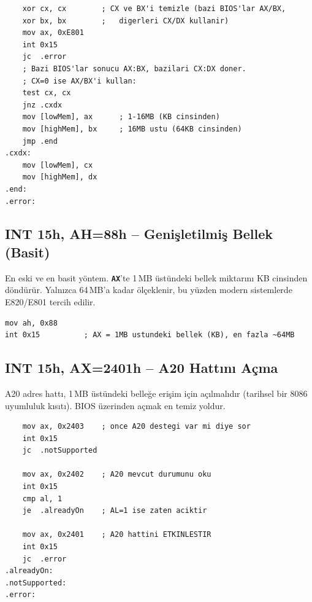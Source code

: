 \documentclass[11pt,a4paper]{article}
\newcommand{\reg}[1]{\texttt{\color{anaMavi}\textbf{#1}}}
\begin{document}
\begin{ornekkutu}
\begin{lstlisting}
    xor cx, cx        ; CX ve BX'i temizle (bazi BIOS'lar AX/BX,
    xor bx, bx        ;   digerleri CX/DX kullanir)
    mov ax, 0xE801
    int 0x15
    jc  .error
    ; Bazi BIOS'lar sonucu AX:BX, bazilari CX:DX doner.
    ; CX=0 ise AX/BX'i kullan:
    test cx, cx
    jnz .cxdx
    mov [lowMem], ax      ; 1-16MB (KB cinsinden)
    mov [highMem], bx     ; 16MB ustu (64KB cinsinden)
    jmp .end
.cxdx:
    mov [lowMem], cx
    mov [highMem], dx
.end:
.error:
\end{lstlisting}
\end{ornekkutu}

\subsection{INT 15h, AH=88h -- Genişletilmiş Bellek (Basit)}

En eski ve en basit yöntem. \reg{AX}'te 1\,MB üstündeki bellek miktarını KB
cinsinden döndürür. Yalnızca 64\,MB'a kadar ölçeklenir, bu yüzden modern
sistemlerde E820/E801 tercih edilir.

\begin{lstlisting}
mov ah, 0x88
int 0x15          ; AX = 1MB ustundeki bellek (KB), en fazla ~64MB
\end{lstlisting}

\subsection{INT 15h, AX=2401h -- A20 Hattını Açma}

A20 adres hattı, 1\,MB üstündeki belleğe erişim için açılmalıdır (tarihsel bir
8086 uyumluluk kısıtı). BIOS üzerinden açmak en temiz yoldur.

\begin{ornekkutu}
\begin{lstlisting}
    mov ax, 0x2403    ; once A20 destegi var mi diye sor
    int 0x15
    jc  .notSupported

    mov ax, 0x2402    ; A20 mevcut durumunu oku
    int 0x15
    cmp al, 1
    je  .alreadyOn    ; AL=1 ise zaten aciktir

    mov ax, 0x2401    ; A20 hattini ETKINLESTIR
    int 0x15
    jc  .error
.alreadyOn:
.notSupported:
.error:
\end{lstlisting}
\end{ornekkutu}
\end{document}
